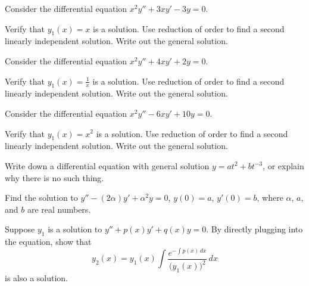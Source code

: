 \documentclass{ximera}
\begin{document}
\begin{exercise}%
    Consider the differential equation $x^2y'' + 3xy' - 3y = 0$.
    \begin{tasks}
        \task Verify that $y_1(x) = x$ is a solution.
        \task Use reduction of order to find a second linearly independent solution.
        \task Write out the general solution. 
    \end{tasks}
\end{exercise}

\begin{exercise}%
    Consider the differential equation $x^2y'' + 4xy' + 2y = 0$.
    \begin{tasks}
        \task Verify that $y_1(x) = \frac{1}{x}$ is a solution.
        \task Use reduction of order to find a second linearly independent solution.
        \task Write out the general solution. 
    \end{tasks}
\end{exercise}

\begin{exercise}%
    Consider the differential equation $x^2y'' -6xy' + 10y = 0$.
    \begin{tasks}
        \task Verify that $y_1(x) = x^2$ is a solution.
        \task Use reduction of order to find a second linearly independent solution.
        \task Write out the general solution. 
    \end{tasks}
\end{exercise}

\begin{exercise}
    Write down a differential equation with general solution $y=at^2+bt^{-3}$, or explain why there is no such thing.
\end{exercise}

\begin{exercise}
    Find the solution to $y''-(2\alpha) y' + \alpha^2 y=0$, $y(0) = a$, $y'(0)=b$, where $\alpha$, $a$, and $b$ are real numbers.
\end{exercise}

\begin{exercise} \label{exercise:reductionoforder}
    Suppose $y_1$ is a solution to $y'' + p(x) y' + q(x) y = 0$. By directly plugging into the equation, show that
    \begin{equation*}
        y_2(x) = y_1(x) \int \frac{e^{-\int p(x)\,dx}}{{\bigl(y_1(x)\bigr)}^2} \,dx
    \end{equation*}
    is also a solution.
\end{exercise}
\end{document}
